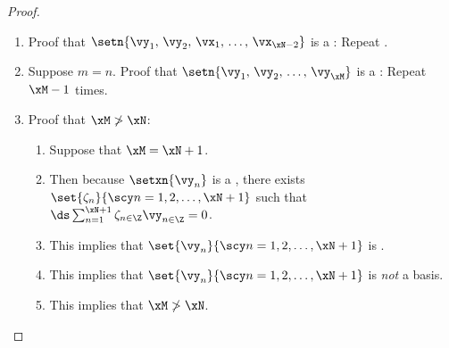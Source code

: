 \begin{proof}
\begin{enumerate}
\begin{enumerate}
      \item Proof that $\setn{\vy_1,\,\vx_1,\,\ldots,\,\vx_{\xN-1}}$ is :
        \begin{enumerate}
          \item If $\setn{\vy_1,\,\vx_1,\,\ldots,\,\vx_{\xN-1}}$ is , then there exists
                   $\setn{\epsilon,\,\epsilon_1,\,\ldots,\,\epsilon_{\xN-1}}$ such that
            \\$\ds\epsilon\vy_1 + \brp{\sum_{n=1}^{\xN-1}\epsilon_{n\in\Z} \vx_n} + 0\vx_{n} = 0$.  \label{item:frm_MN_epsilon}
          \item {} implies that the coordinate of $\vy_1$ associated with $\vx_n$ \emph{is} $0$.
            \\$\ds\vy_1 = -\brp{\sum_{n=1}^{\xN-1}\frac{\epsilon_n}{\epsilon} \vx_n} + 0\vx_{n} = 0$.  \label{item:frm_MN_epsilon1}
          \item {} implies that the coordinate of $\vy_1$ associated with $\vx_n$ is \emph{not} $0$.
            \\$\ds \vy_1 = -\sum_{n=1}^\xN \frac{\alpha_n}{\beta}\vx_n$.  \label{item:frm_MN_epsilon2}
          \item This implies that  (that the set is linearly dependent) is \emph{false}
                because  and  \emph{contradict} each other.
          \item This implies $\setn{\vy_1,\,\vx_1,\,\ldots,\,\vx_{\xN-1}}$ is .
        \end{enumerate}

    \end{enumerate}

  \item Proof that $\setn{\vy_1,\,\vy_2,\,\vx_1,\,\ldots,\,\vx_{\xN-2}}$ is a : Repeat .

  \item Suppose $m=n$. Proof that $\setn{\vy_1,\,\vy_2,\,\ldots,\,\vy_\xM}$ is a :
        Repeat  $\xM-1$ times.
        \label{item:frm_MN_xM}

  \item Proof that $\xM\ngtr\xN$: \label{item:frm_MN_ngtr}
    \begin{enumerate}
      \item Suppose that $\xM=\xN+1$.
      \item Then because $\setxn{\vy_n}$ is a , there exists $\set{\zeta_n}{\scy n=1,2,\ldots,\xN+1}$ such that
        \\$\ds \sum_{n=1}^{\xN+1} \zeta_{n\in\Z} \vy_{n\in\Z} = 0$.
      \item This implies that $\set{\vy_n}{\scy n=1,2,\ldots,\xN+1}$ is .
      \item This implies that $\set{\vy_n}{\scy n=1,2,\ldots,\xN+1}$ is \emph{not} a basis.
      \item This implies that $\xM\ngtr\xN$.
    \end{enumerate}


\end{enumerate}
\end{proof}

